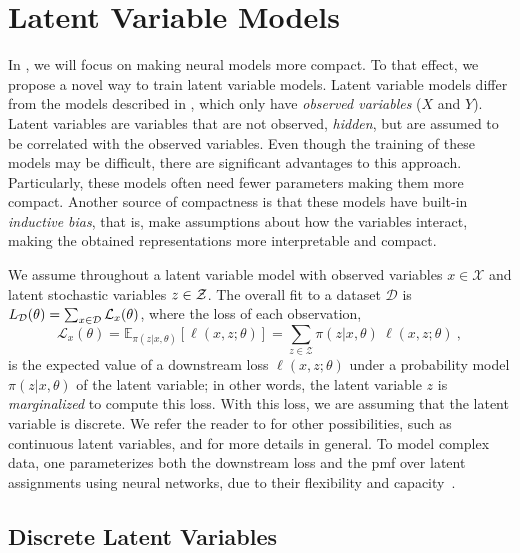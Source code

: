 \section{Latent Variable Models}
\label{sec:lvm}

\noindent In , we will focus on making neural models
more compact. To that effect, we propose a novel way to train latent
variable models. Latent variable models differ from the models
described in , which only have \textit{observed
        variables} ($X$ and $Y$). Latent variables are variables that are not
observed, \ie \textit{hidden}, but are assumed to be correlated with
the observed variables. Even though the training of these models
may be difficult, there are significant advantages to this approach.
Particularly, these models often need fewer parameters making them more compact.
Another source of compactness is that these models
have built-in \textit{inductive bias}, that is,
make assumptions about how the variables interact, making the obtained
representations more interpretable and compact.

We assume throughout a latent variable model with observed variables
$x \in \mathcal{X}$ and latent stochastic variables $z \in \mathcal{Z}$. The
overall fit to a dataset $\mathcal D$ is $L_\mathcal{D}(\theta) =
        \sum_{x \in \mathcal{D}} \mathcal{L}_x(\theta)$, where the loss of each
observation,
%
\begin{equation}\label{eq:fit}
        \mathcal{L}_{x}(\theta) =
        \mathbb E_{\pi(z|x, \theta)}
        \left[ \ell(x, z; \theta)\right] =
        \sum_{z \in \mathcal Z} \pi(z | x, \theta)~\ell(x, z; \theta) ~,
\end{equation}
%
is the expected value of a downstream loss $\ell(x,z;\theta)$ under a
probability model $\pi(z|x,\theta)$ of the latent variable; in other
words, the latent variable $z$ is {\it marginalized} to compute this loss.
With this loss, we are assuming that the latent variable is discrete. We refer the reader
to \citet{Kim2018} for other possibilities, such as continuous latent variables, and for more
details in general.
To model complex data, one parameterizes both the downstream loss and
the pmf over latent assignments using neural networks, due
to their flexibility and capacity~\citep{Kingma+2014:VAE}.

\subsection{Discrete Latent Variables}\label{sec:discrete_lvm_bg}

